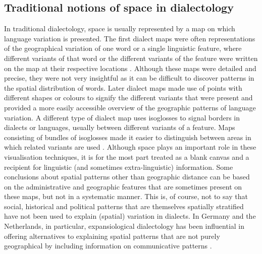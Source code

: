 \documentclass[output=paper,colorlinks,citecolor=brown,draft]{langscibook}
\begin{document}
\subsection{Traditional notions of space in dialectology}
In traditional dialectology, space is usually represented by a map on which language variation is presented. The first dialect maps were often representations of the geographical variation of one word or a single linguistic feature, where different variants of that word or the different variants of the feature were written on the map at their respective locations \citep{rabanus_dialect_2017}. Although these maps were detailed and precise, they were not very insightful as it can be difficult to discover patterns in the spatial distribution of words. Later dialect maps made use of points with different shapes or colours to signify the different variants that were present and provided a more easily accessible overview of the geographic patterns of language variation. A different type of dialect map uses isoglosses to signal borders in dialects or languages, usually between different variants of a feature. Maps consisting of bundles of isoglosses made it easier to distinguish between areas in which related variants are used \citep{rabanus_dialect_2017}. Although space plays an important role in these visualisation techniques, it is for the most part treated as a blank canvas and a recipient for linguistic (and sometimes extra-linguistic) information. Some conclusions about spatial patterns other than geographic distance can be based on the administrative and geographic features that are sometimes present on these maps, but not in a systematic manner. This is, of course, not to say that social, historical and political patterns that are themselves spatially stratified have not been used to explain (spatial) variation in dialects. In Germany and the Netherlands, in particular, expansiological dialectology has been influential in offering alternatives to explaining spatial patterns that are not purely geographical by including information on communicative patterns \citep{goossens_geschiedenis_1977}.
\largerpage
\end{document}
